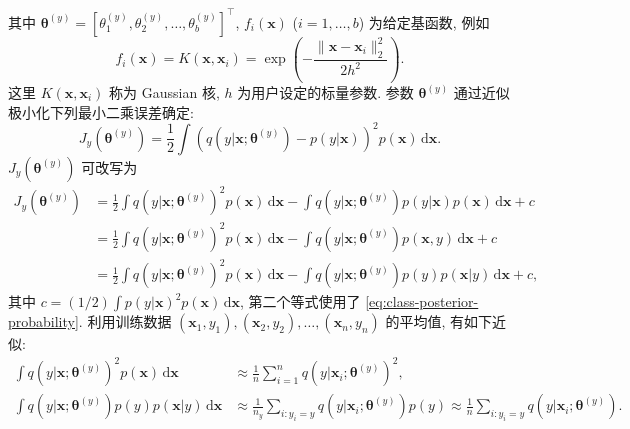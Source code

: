 {其中 $\boldsymbol{\theta}^{(y)}=[\theta_1^{(y)},\theta_2^{(y)},\ldots,\theta_b^{(y)}]^{\top}$, $f_i(\boldsymbol{x})$ ($i=1,\ldots,b$) 为给定基函数, 例如}
\begin{equation}\label{eq:classification-gaussian-kernel}
f_i(\boldsymbol{x})=K(\boldsymbol{x},\boldsymbol{x}_i)=\exp\left(-\frac{\|\boldsymbol{x}-\boldsymbol{x}_i\|_2^2}{2h^2}\right).
\end{equation}
{这里 $K(\boldsymbol{x},\boldsymbol{x}_i)$ 称为 Gaussian 核, $h$ 为用户设定的标量参数. 参数 $\boldsymbol{\theta}^{(y)}$ 通过近似极小化下列最小二乘误差确定:}
\[J_y(\boldsymbol{\theta}^{(y)})=\frac12\int\left(q(y|\boldsymbol{x};\boldsymbol{\theta}^{(y)})-p(y|\boldsymbol{x})\right)^2p(\boldsymbol{x})\,\mathrm d\boldsymbol{x}.\]
{$J_y(\boldsymbol{\theta}^{(y)})$ 可改写为}
\begin{equation}\label{eq:classification-integral-loss}
\begin{aligned}
J_y(\boldsymbol{\theta}^{(y)})&=\frac12\int q(y|\boldsymbol{x};\boldsymbol{\theta}^{(y)})^2p(\boldsymbol{x})\,\mathrm d\boldsymbol{x}-\int q(y|\boldsymbol{x};\boldsymbol{\theta}^{(y)})p(y|\boldsymbol{x})p(\boldsymbol{x})\,\mathrm d\boldsymbol{x}+c\\
&=\frac12\int q(y|\boldsymbol{x};\boldsymbol{\theta}^{(y)})^2p(\boldsymbol{x})\,\mathrm d\boldsymbol{x}-\int q(y|\boldsymbol{x};\boldsymbol{\theta}^{(y)})p(\boldsymbol{x},y)\,\mathrm d\boldsymbol{x}+c\\
&=\frac12\int q(y|\boldsymbol{x};\boldsymbol{\theta}^{(y)})^2p(\boldsymbol{x})\,\mathrm d\boldsymbol{x}-\int q(y|\boldsymbol{x};\boldsymbol{\theta}^{(y)})p(y)p(\boldsymbol{x}|y)\,\mathrm d\boldsymbol{x}+c,
\end{aligned}
\end{equation}
{其中 $c=(1/2)\int p(y|\boldsymbol{x})^2p(\boldsymbol{x})\,\mathrm d\boldsymbol{x}$, 第二个等式使用了 \eqref{eq:class-posterior-probability}. 利用训练数据 \linebreak[4]$(\boldsymbol{x}_1,y_1),(\boldsymbol{x}_2,y_2),\ldots,(\boldsymbol{x}_n,y_n)$ 的平均值, 有如下近似:}
\[\begin{aligned}
\int q(y|\boldsymbol{x};\boldsymbol{\theta}^{(y)})^2p(\boldsymbol{x})\,\mathrm d\boldsymbol{x}&\approx\frac1n\sum_{i=1}^nq(y|\boldsymbol{x}_i;\boldsymbol{\theta}^{(y)})^2,\\
\int q(y|\boldsymbol{x};\boldsymbol{\theta}^{(y)})p(y)p(\boldsymbol{x}|y)\,\mathrm d\boldsymbol{x}&\approx\frac1{n_y}\sum_{i:y_i=y}q(y|\boldsymbol{x}_i;\boldsymbol{\theta}^{(y)})p(y)\approx\frac1n\sum_{i:y_i=y}q(y|\boldsymbol{x}_i;\boldsymbol{\theta}^{(y)}).
\end{aligned}\]
